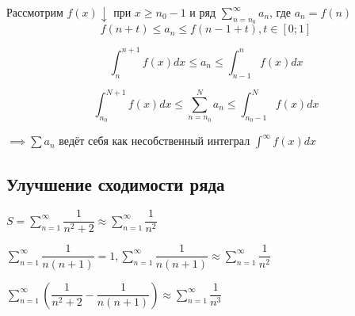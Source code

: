 Рассмотрим $f(x) \downarrow$ при $x \geq n_0 - 1$ и ряд $\sum_{n=n_0}^{\infty} a_n$, где $a_n = f(n)$ 
$$f(n + t) \leq a_n \leq f(n - 1 + t), t \in [0; 1]$$

$$\int_{n}^{n+1} f(x)dx \leq a_n \leq \int_{n-1}^{n} f(x)dx$$

$$\int_{n_0}^{N+1} f(x)dx \leq \sum_{n=n_0}^{N} a_n \leq \int_{n_0-1}^{N} f(x)dx$$

$\implies \sum a_n$ ведёт себя как несобственный интеграл $\int^{\infty}f(x)dx$

\subsection{Улучшение сходимости ряда}

$S = \sum_{n=1}^{\infty} \dfrac{1}{n^2 + 2} \approx \sum_{n=1}^{\infty} \dfrac{1}{n^2}$

$\sum_{n=1}^{\infty} \dfrac{1}{n(n + 1)} = 1, \sum_{n=1}^{\infty} \dfrac{1}{n(n + 1)} \approx \sum_{n=1}^{\infty} \dfrac{1}{n^2}$

$\sum_{n=1}^{\infty} \left(\dfrac{1}{n^2 + 2} - \dfrac{1}{n(n + 1)}\right) \approx \sum_{n=1}^{\infty} \dfrac{1}{n^3}$


